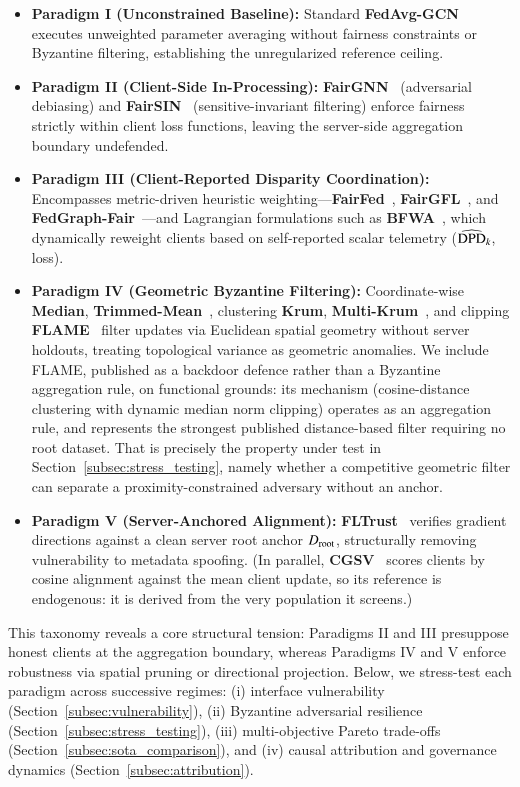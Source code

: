 \begin{itemize}[leftmargin=1.5em, itemsep=3pt, topsep=3pt]
    \item \textbf{Paradigm I (Unconstrained Baseline):} Standard \textbf{FedAvg-GCN}~\citep{mcmahan2017communication} executes unweighted parameter averaging without fairness constraints or Byzantine filtering, establishing the unregularized reference ceiling.
    \item \textbf{Paradigm II (Client-Side In-Processing):} \textbf{FairGNN}~\citep{dai2021say} (adversarial debiasing) and \textbf{FairSIN}~\citep{yang2024fairsin} (sensitive-invariant filtering) enforce fairness strictly within client loss functions, leaving the server-side aggregation boundary undefended.
    \item \textbf{Paradigm III (Client-Reported Disparity Coordination):} Encompasses metric-driven heuristic weighting---\textbf{FairFed}~\citep{ezzeldin2023fairfed}, \textbf{FairGFL}~\citep{zhou2026fairgfl}, and \textbf{FedGraph-Fair}~\citep{khan2026fedgraphfair}---and Lagrangian formulations such as \textbf{BFWA}~\citep{dang2026fedfairgnn}, which dynamically reweight clients based on self-reported scalar telemetry ($\widehat{\mathrm{DPD}}_k$, loss).
    \item \textbf{Paradigm IV (Geometric Byzantine Filtering):} Coordinate-wise \textbf{Median}, \textbf{Trimmed-Mean}~\citep{yin2018byzantine}, clustering \textbf{Krum}, \textbf{Multi-Krum}~\citep{blanchard2017krum}, and clipping \textbf{FLAME}~\citep{nguyen2022flame} filter updates via Euclidean spatial geometry without server holdouts, treating topological variance as geometric anomalies. We include FLAME, published as a backdoor defence rather than a Byzantine aggregation rule, on functional grounds: its mechanism (cosine-distance clustering with dynamic median norm clipping) operates as an aggregation rule, and represents the strongest published distance-based filter requiring no root dataset. That is precisely the property under test in Section~\ref{subsec:stress_testing}, namely whether a competitive geometric filter can separate a proximity-constrained adversary without an anchor.
    \item \textbf{Paradigm V (Server-Anchored Alignment):} \textbf{FLTrust}~\citep{cao2021fltrust} verifies gradient directions against a clean server root anchor $D_{\mathrm{root}}$, structurally removing vulnerability to metadata spoofing. (In parallel, \textbf{CGSV}~\citep{xu2021gradient} scores clients by cosine alignment against the mean client update, so its reference is endogenous: it is derived from the very population it screens.)
\end{itemize}
This taxonomy reveals a core structural tension: Paradigms II and III presuppose honest clients at the aggregation boundary, whereas Paradigms IV and V enforce robustness via spatial pruning or directional projection. Below, we stress-test each paradigm across successive regimes: (i) interface vulnerability (Section~\ref{subsec:vulnerability}), (ii) Byzantine adversarial resilience (Section~\ref{subsec:stress_testing}), (iii) multi-objective Pareto trade-offs (Section~\ref{subsec:sota_comparison}), and (iv) causal attribution and governance dynamics (Section~\ref{subsec:attribution}).

